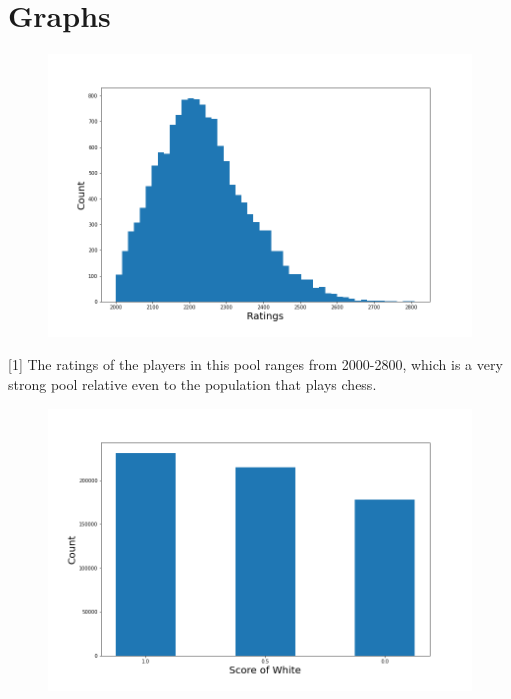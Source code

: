 \documentclass[12pt, letterpaper]{article}
\begin{document}
\section*{Graphs}

\begin{figure}[hbp]

	\centering
	
	\includegraphics[width=\linewidth]{../figures/LiChessFigs/ratings_hist.png}
	
\end{figure}

[1] The ratings of the players in this pool ranges from 2000-2800, which is a very strong pool relative even to the population that plays chess.

\pagebreak

\begin{figure}[hbp]

	\centering 
	
	\includegraphics[width=\linewidth]{../figures/LiChessFigs/white_win.png}

\end{figure}
\end{document}
